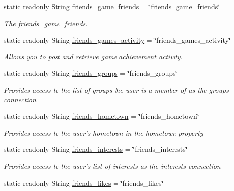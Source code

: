 \begin{DoxyCompactItemize}
static readonly String \hyperlink{classcom_1_1shephertz_1_1app42_1_1paas_1_1sdk_1_1csharp_1_1social_1_1_f_b_perms_a80659cbbe32a1f5b23664692e4902a76}{friends\+\_\+game\+\_\+friends} = \char`\"{}friends\+\_\+game\+\_\+friends\char`\"{}
\begin{DoxyCompactList}\small\item\em The friends\+\_\+game\+\_\+friends. \end{DoxyCompactList}\item 
static readonly String \hyperlink{classcom_1_1shephertz_1_1app42_1_1paas_1_1sdk_1_1csharp_1_1social_1_1_f_b_perms_abc56d0c890e3b4b58e30366f8cc911df}{friends\+\_\+games\+\_\+activity} = \char`\"{}friends\+\_\+games\+\_\+activity\char`\"{}
\begin{DoxyCompactList}\small\item\em Allows you to post and retrieve game achievement activity. \end{DoxyCompactList}\item 
static readonly String \hyperlink{classcom_1_1shephertz_1_1app42_1_1paas_1_1sdk_1_1csharp_1_1social_1_1_f_b_perms_aeaef62a98578d7c92455857b0f237e31}{friends\+\_\+groups} = \char`\"{}friends\+\_\+groups\char`\"{}
\begin{DoxyCompactList}\small\item\em Provides access to the list of groups the user is a member of as the groups connection \end{DoxyCompactList}\item 
static readonly String \hyperlink{classcom_1_1shephertz_1_1app42_1_1paas_1_1sdk_1_1csharp_1_1social_1_1_f_b_perms_aea22ed4ca158e306f2964b6a3de1928b}{friends\+\_\+hometown} = \char`\"{}friends\+\_\+hometown\char`\"{}
\begin{DoxyCompactList}\small\item\em Provides access to the user's hometown in the hometown property \end{DoxyCompactList}\item 
static readonly String \hyperlink{classcom_1_1shephertz_1_1app42_1_1paas_1_1sdk_1_1csharp_1_1social_1_1_f_b_perms_a58e417216e8b8c090e86abdd595e37ad}{friends\+\_\+interests} = \char`\"{}friends\+\_\+interests\char`\"{}
\begin{DoxyCompactList}\small\item\em Provides access to the user's list of interests as the interests connection \end{DoxyCompactList}\item 
static readonly String \hyperlink{classcom_1_1shephertz_1_1app42_1_1paas_1_1sdk_1_1csharp_1_1social_1_1_f_b_perms_ad6603b10e68705632c605f811d0b9aa1}{friends\+\_\+likes} = \char`\"{}friends\+\_\+likes\char`\"{}

\end{DoxyCompactItemize}
